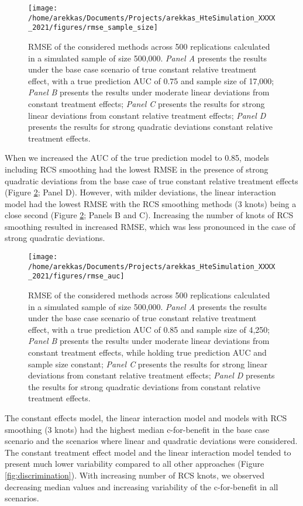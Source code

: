 \documentclass{article}
\begin{document}
\begin{figure}
\texttt{[image: /home/arekkas/Documents/Projects/arekkas\_HteSimulation\_XXXX\_2021/figures/rmse\_sample\_size]} \caption{RMSE of the considered methods across 500 replications calculated in a simulated sample of size 500,000. \textit{Panel A} presents the results under the base case scenario of true constant relative treatment effect, with a true prediction AUC of 0.75 and sample size of 17,000; \textit{Panel B} presents the results under moderate linear deviations from constant treatment effects; \textit{Panel C} presents the results for strong linear deviations from constant relative treatment effects; \textit{Panel D} presents the results for strong quadratic deviations constant relative treatment effects.}\label{fig:rmsesamplesize}
\end{figure}

When we increased the AUC of the true prediction model to 0.85, models
including RCS smoothing had the lowest RMSE in the presence of strong
quadratic deviations from the base case of true constant relative
treatment effects (Figure \ref{fig:rmseauc}; Panel D). However, with
milder deviations, the linear interaction model had the lowest RMSE with
the RCS smoothing methods (3 knots) being a close second (Figure
\ref{fig:rmseauc}; Panels B and C). Increasing the number of knots of
RCS smoothing resulted in increased RMSE, which was less pronounced in
the case of strong quadratic deviations.

\begin{figure}
\texttt{[image: /home/arekkas/Documents/Projects/arekkas\_HteSimulation\_XXXX\_2021/figures/rmse\_auc]} \caption{RMSE of the considered methods across 500 replications calculated in a simulated sample of size 500,000. \textit{Panel A} presents the results under the base case scenario of true constant relative treatment effect, with a true prediction AUC of 0.85 and sample size of 4,250; \textit{Panel B} presents the results under moderate linear deviations from constant treatment effects, while holding true prediction AUC and sample size constant; \textit{Panel C} presents the results for strong linear deviations from constant relative treatment effects; \textit{Panel D} presents the results for strong quadratic deviations from constant relative treatment effects.}\label{fig:rmseauc}
\end{figure}

The constant effects model, the linear interaction model and models with
RCS smoothing (3 knots) had the highest median c-for-benefit in the base
case scenario and the scenarios where linear and quadratic deviations
were considered. The constant treatment effect model and the linear
interaction model tended to present much lower variability compared to
all other approaches (Figure \ref{fig:discrimination}). With increasing
number of RCS knots, we observed decreasing median values and increasing
variability of the c-for-benefit in all scenarios.
\end{document}

